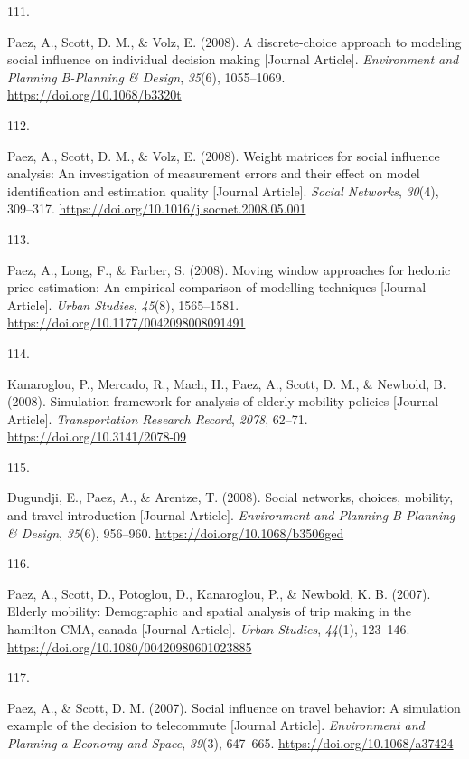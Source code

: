 \documentclass[10pt,a4paper,]{twentysecondcv}
\newlength{\csllabelwidth}
\newcommand{\CSLLeftMargin}[1]{\parbox[t]{\csllabelwidth}{#1}}
\newcommand{\CSLRightInline}[1]{\parbox[t]{\linewidth - \csllabelwidth}{#1}}
\begin{document}
\leavevmode{}%
\CSLLeftMargin{111. }%
\CSLRightInline{Paez, A., Scott, D. M., \& Volz, E. (2008). A
discrete-choice approach to modeling social influence on individual
decision making {[}Journal Article{]}. \emph{Environment and Planning
B-Planning \& Design}, \emph{35}(6), 1055--1069.
\url{https://doi.org/10.1068/b3320t}}

\leavevmode{}%
\CSLLeftMargin{112. }%
\CSLRightInline{Paez, A., Scott, D. M., \& Volz, E. (2008). Weight
matrices for social influence analysis: An investigation of measurement
errors and their effect on model identification and estimation quality
{[}Journal Article{]}. \emph{Social Networks}, \emph{30}(4), 309--317.
\url{https://doi.org/10.1016/j.socnet.2008.05.001}}

\leavevmode{}%
\CSLLeftMargin{113. }%
\CSLRightInline{Paez, A., Long, F., \& Farber, S. (2008). Moving window
approaches for hedonic price estimation: An empirical comparison of
modelling techniques {[}Journal Article{]}. \emph{Urban Studies},
\emph{45}(8), 1565--1581.
\url{https://doi.org/10.1177/0042098008091491}}

\leavevmode{}%
\CSLLeftMargin{114. }%
\CSLRightInline{Kanaroglou, P., Mercado, R., Mach, H., Paez, A., Scott,
D. M., \& Newbold, B. (2008). Simulation framework for analysis of
elderly mobility policies {[}Journal Article{]}. \emph{Transportation
Research Record}, \emph{2078}, 62--71.
\url{https://doi.org/10.3141/2078-09}}

\leavevmode{}%
\CSLLeftMargin{115. }%
\CSLRightInline{Dugundji, E., Paez, A., \& Arentze, T. (2008). Social
networks, choices, mobility, and travel introduction {[}Journal
Article{]}. \emph{Environment and Planning B-Planning \& Design},
\emph{35}(6), 956--960. \url{https://doi.org/10.1068/b3506ged}}

\leavevmode{}%
\CSLLeftMargin{116. }%
\CSLRightInline{Paez, A., Scott, D., Potoglou, D., Kanaroglou, P., \&
Newbold, K. B. (2007). Elderly mobility: Demographic and spatial
analysis of trip making in the hamilton CMA, canada {[}Journal
Article{]}. \emph{Urban Studies}, \emph{44}(1), 123--146.
\url{https://doi.org/10.1080/00420980601023885}}

\leavevmode{}%
\CSLLeftMargin{117. }%
\CSLRightInline{Paez, A., \& Scott, D. M. (2007). Social influence on
travel behavior: A simulation example of the decision to telecommute
{[}Journal Article{]}. \emph{Environment and Planning a-Economy and
Space}, \emph{39}(3), 647--665. \url{https://doi.org/10.1068/a37424}}
\end{document}
